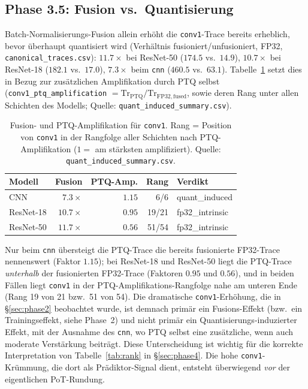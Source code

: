 \subsection{Phase 3.5: Fusion vs.\ Quantisierung}
\label{sec:phase35}

Batch-Normalisierungs-Fusion allein erhöht die \texttt{conv1}-Trace bereits erheblich, bevor überhaupt quantisiert wird (Verhältnis fusioniert/unfusioniert, FP32, \texttt{canonical\_traces.csv}): $11.7\times$ bei ResNet-50 ($174.5$ vs.\ $14.9$), $10.7\times$ bei ResNet-18 ($182.1$ vs.\ $17.0$), $7.3\times$ beim \texttt{cnn} ($460.5$ vs.\ $63.1$). Tabelle~\ref{tab:fusion} setzt dies in Bezug zur zusätzlichen Amplifikation durch PTQ selbst (\texttt{conv1\_ptq\_amplification} $=\mathrm{Tr}_{\mathrm{PTQ}}/\mathrm{Tr}_{\mathrm{FP32,fused}}$, sowie deren Rang unter allen Schichten des Modells; Quelle: \texttt{quant\_induced\_summary.csv}).

\begin{table}[t]
\centering
\small
\caption{Fusion- und PTQ-Amplifikation für \texttt{conv1}. Rang = Position von \texttt{conv1} in der Rangfolge aller Schichten nach PTQ-Amplifikation ($1=$ am stärksten amplifiziert). Quelle: \texttt{quant\_induced\_summary.csv}.}
\label{tab:fusion}
\begin{tabular}{lrrrl}
\toprule
Modell & Fusion & PTQ-Amp. & Rang & Verdikt \\
\midrule
CNN & $7.3\times$ & $1.15$ & 6/6 & quant\_induced \\
ResNet-18 & $10.7\times$ & $0.95$ & 19/21 & fp32\_intrinsic \\
ResNet-50 & $11.7\times$ & $0.56$ & 51/54 & fp32\_intrinsic \\
\bottomrule
\end{tabular}
\end{table}

Nur beim \texttt{cnn} übersteigt die PTQ-Trace die bereits fusionierte FP32-Trace nennenswert (Faktor $1.15$); bei ResNet-18 und ResNet-50 liegt die PTQ-Trace \emph{unterhalb} der fusionierten FP32-Trace (Faktoren $0.95$ und $0.56$), und in beiden Fällen liegt \texttt{conv1} in der PTQ-Amplifikations-Rangfolge nahe am unteren Ende (Rang 19 von 21 bzw.\ 51 von 54). Die dramatische \texttt{conv1}-Erhöhung, die in \S\ref{sec:phase2} beobachtet wurde, ist demnach primär ein Fusions-Effekt (bzw.\ ein Trainingseffekt, siehe Phase~2) und nicht primär ein Quantisierungs-induzierter Effekt, mit der Ausnahme des \texttt{cnn}, wo PTQ selbst eine zusätzliche, wenn auch moderate Verstärkung beiträgt. Diese Unterscheidung ist wichtig für die korrekte Interpretation von Tabelle~\ref{tab:rank} in \S\ref{sec:phase4}. Die hohe \texttt{conv1}-Krümmung, die dort als Prädiktor-Signal dient, entsteht überwiegend \emph{vor} der eigentlichen PoT-Rundung.


